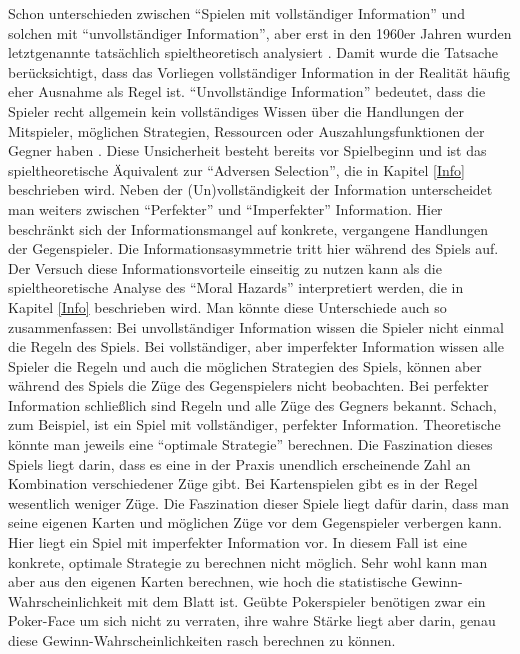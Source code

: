 Schon \textcite{Morgenstern1944} unterschieden zwischen "`Spielen mit vollständiger Information"' und solchen mit "`unvollständiger Information"', aber erst in den 1960er Jahren wurden letztgenannte tatsächlich spieltheoretisch analysiert \parencite[S. 137]{Harsanyi1994}. Damit wurde die Tatsache berücksichtigt, dass das Vorliegen vollständiger Information in der Realität häufig eher Ausnahme als Regel ist. "`Unvollständige Information"' bedeutet, dass die Spieler recht allgemein kein vollständiges Wissen über die Handlungen der Mitspieler, möglichen Strategien, Ressourcen oder Auszahlungsfunktionen der Gegner haben \parencite[S. 137]{Harsanyi1994}. Diese Unsicherheit besteht bereits vor Spielbeginn und ist das spieltheoretische Äquivalent zur "`Adversen Selection"', die in Kapitel \ref{Info} beschrieben wird. Neben der (Un)vollständigkeit der Information unterscheidet man weiters zwischen "`Perfekter"' und "`Imperfekter"' Information. Hier beschränkt sich der Informationsmangel auf konkrete, vergangene Handlungen der Gegenspieler.  Die Informationsasymmetrie tritt hier während des Spiels auf. Der Versuch diese Informationsvorteile einseitig zu nutzen kann als die spieltheoretische Analyse des "`Moral Hazards"' interpretiert werden, die in Kapitel \ref{Info} beschrieben wird. Man könnte diese Unterschiede auch so zusammenfassen: Bei unvollständiger Information wissen die Spieler nicht einmal die Regeln des Spiels. Bei vollständiger, aber imperfekter Information wissen alle Spieler die Regeln und auch die möglichen Strategien des Spiels, können aber während des Spiels die Züge des Gegenspielers nicht beobachten. Bei perfekter Information schließlich sind Regeln und alle Züge des Gegners bekannt. Schach, zum Beispiel, ist ein Spiel mit vollständiger, perfekter Information. Theoretische könnte man jeweils eine "`optimale Strategie"' berechnen. Die Faszination dieses Spiels liegt darin, dass es eine in der Praxis unendlich erscheinende Zahl an Kombination verschiedener Züge gibt. Bei Kartenspielen gibt es in der Regel wesentlich weniger Züge. Die Faszination dieser Spiele liegt dafür darin, dass man seine eigenen Karten und möglichen Züge vor dem Gegenspieler verbergen kann. Hier liegt ein Spiel mit imperfekter Information vor. In diesem Fall ist eine konkrete, optimale Strategie zu berechnen nicht möglich. Sehr wohl kann man aber aus den eigenen Karten berechnen, wie hoch die statistische Gewinn-Wahrscheinlichkeit mit dem Blatt ist. Geübte Pokerspieler benötigen zwar ein Poker-Face um sich nicht zu verraten, ihre wahre Stärke liegt aber darin, genau diese Gewinn-Wahrscheinlichkeiten rasch berechnen zu können.

